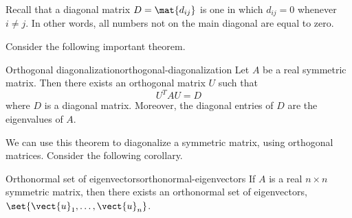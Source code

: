 Recall that a diagonal matrix $D=\mat{d_{ij} }$ is one in which $d_{ij} = 0$ whenever $i \neq j$. In other words, all numbers not on the main diagonal are equal to zero.

Consider the following important theorem.

\begin{theorem}{Orthogonal diagonalization}{orthogonal-diagonalization}
Let $A$ be a real symmetric matrix. Then there exists an
orthogonal matrix $U$ such that
\[
U^{T}AU = D
\]
where $D$ is a diagonal matrix. Moreover,
the diagonal entries of $D$ are the eigenvalues of $A$.
\end{theorem}

We can use this theorem to diagonalize a symmetric matrix, using orthogonal matrices. Consider the following corollary.

\begin{corollary}{Orthonormal set of eigenvectors}{orthonormal-eigenvectors}
If $A$ is a real $n\times n$ symmetric matrix, then there exists an
orthonormal set of eigenvectors, $\set{\vect{u}_{1},\ldots,\vect{u}
_{n}}$.
\end{corollary}

